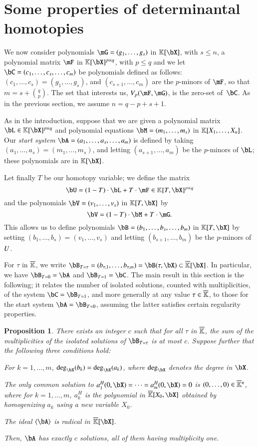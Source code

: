 \documentclass[amsthm]{elsart}
\newtheorem{proposition}[definition]{Proposition}
\begin{document}
\section{Some properties of determinantal homotopies}\label{sec:homotopy}

We now consider polynomials $\mG=(g_1,\dots,g_s)$ in $\KK[\bX]$, with
$s \le n$, a polynomial matrix $\mF$ in $\KK[\bX]^{p \times q}$, with
$p \le q$ and we let $\bC=(c_1,\dots,c_{s},\dots,c_m)$ be polynomials
defined as follows: $(c_1,\dots,c_{s})=(g_1,\dots,g_s)$, and
$(c_{s+1},\dots,c_{m})$ are the $p$-minors of $\mF$, so that $m=s+{q
  \choose p}$. The set that interests us, $\VpFG{p}{\mF}{\mG}$, is the
zero-set of~$\bC$. As in the previous section, we assume $n=q-p+s+1$.

As in the introduction, suppose that we are given a polynomial matrix
$\bL \in \K[\bX]^{p \times q}$ and polynomial equations
$\bM=(m_1,\dots,m_s)$ in $\mathbb{K}[X_1,\dots,X_n]$. Our {\em start system}
$\bA=(a_1,\dots,a_s,\dots,a_m)$ is defined by taking $(a_1,\dots,a_s) =
(m_1,\dots,m_s)$, and letting $(a_{s+1},\dots,a_m)$ be the $p$-minors
of $\bL$; these polynomials are in $\KK[\bX]$. 

Let finally $T$ be our homotopy variable; we define the matrix
\[\bU = (1-T)\cdot \bL + T \cdot \mF \in \KK[T, \bX]^{p \times q}\]
and the polynomials $\bV=(v_1,\dots,v_s)$ in $\K[T,\bX]$ by
\[\bV = (1-T) \cdot \bM + T \cdot \mG.\]
This allows us to define polynomials $\bB=(b_1,\dots,b_s,\dots,b_m)$
in $\KK[T,\bX]$ by setting $(b_1,\dots,b_s)=(v_1,\dots,v_s)$
and letting $(b_{s+1},\dots,b_m)$ be the $p$-minors of ${U}$.

For $\tau$ in $\overline{\mathbb{K}}$, we write
$\bB_{T=\tau}=(b_{\tau,1},\dots,b_{\tau,m})=\bB(\tau,\bX)\subset
\KKbar[\bX]$. In particular, we have $\bB_{T=0}=\bA$ and
$\bB_{T=1}=\bC$.  The main result in this section is the following; it
relates the number of isolated solutions, counted with multiplicities,
of the system $\bC=\bB_{T=1}$, and more generally at any value $\tau
\in \overline{\mathbb{K}}$, to those for the start system $\bA=\bB_{T=0}$, assuming the latter
satisfies certain regularity properties.
\begin{proposition}\label{prop:degree_fiber}
  There exists an integer $c$ such that for all $\tau$ in $\overline{\mathbb{K}}$, the
  sum of the multiplicities of the isolated solutions of $\bB_{T=\tau}$
  is at most $c$. Suppose further that the following three conditions
  hold:
\begin{description}[leftmargin=*]
\item[$\assG_1.$] For $k=1,\dots,m$, $\deg_\bX(b_k)=\deg_\bX(a_k)$,
  where $\deg_\bX$ denotes the degree in $\bX$.
\item[$\assG_2.$] The only common solution to
  $a_1^H(0,\bX)=\cdots=a_m^H(0,\bX)=0$ is $(0,\dots,0)\in\overline{\mathbb{K}}{}^n$,
  where for $k=1,\dots,m$, $a_{k}^H$ is the polynomial in
  $\KKbar[X_0,\bX]$ obtained by homogenizing $a_{k}$ using a new
  variable $X_0$.
\item[$\assG_3.$] The ideal $\langle \bA \rangle$ is radical in $\KKbar[\bX]$.
\end{description}
Then, $\bA$ has exactly $c$ solutions, all of them having multiplicity
one.
\end{proposition}
\end{document}
